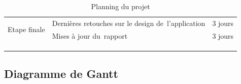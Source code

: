 \begin{table}
\begin{tabular}{|l|l|l|}
\hline
\multirow{2}{*}{Etape finale}   & Dernières retouches sur le design de~l’application                                                                                             & 3 jours               \\
\cline{2-3}
                                & Mises à jour du~rapport                                                                                                                        & 3 jours               \\
\hline
\multicolumn{1}{l}{}            & \multicolumn{1}{l}{}                                                                                                                           & \multicolumn{1}{l}{}  \\
\multicolumn{1}{l}{}            & \multicolumn{1}{l}{}                                                                                                                           & \multicolumn{1}{l}{}  \\
\multicolumn{1}{l}{}            & \multicolumn{1}{l}{}                                                                                                                           & \multicolumn{1}{l}{}
\end{tabular}
\centering
\caption{ Planning du projet}
\end{table}


\subsection{Diagramme de Gantt}


